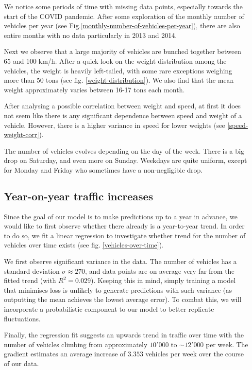 \documentclass[10pt,conference,compsocconf]{IEEEtran}
\begin{document}
We notice some periods of time with missing data points, especially towards the start of the COVID pandemic. After some exploration of the monthly number of vehicles per year (see Fig.\ref{monthly-number-of-vehicles-per-year}), there are also entire months with no data particularly in 2013 and 2014. 

Next we observe that a large majority of vehicles are bunched together between 65 and 100 km/h. After a quick look on the weight distribution among the vehicles, the weight is heavily left-tailed, with some rare exceptions weighing more than 50 tons (see fig. \ref{weight-distribution}). We also find that the mean weight approximately varies between 16-17 tons each month. 

After analysing a possible correlation between weight and speed, at first it does not seem like there is any significant dependence between speed and weight of a vehicle. However, there is a higher variance in speed for lower weights (see \ref{speed-weight-corr}).

The number of vehicles evolves depending on the day of the week. There is a big drop on Saturday, and even more on Sunday. Weekdays are quite uniform, except for Monday and Friday who sometimes have a non-negligible drop.

\subsection{Year-on-year traffic increases}

Since the goal of our model is to make predictions up to a year in advance, we would like to first observe whether there already is a year-to-year trend. In order to do so, we fit a linear regression to investigate whether trend for the number of vehicles over time exists (see fig. \ref{vehicles-over-time}). 

We first observe significant variance in the data. The number of vehicles has a standard deviation $\sigma \approx 270$, and data points are on average very far from the fitted trend (with $R^2 = 0.029$). Keeping this in mind, simply training a model that minimises loss is unlikely to generate predictions with such variance (as outputting the mean achieves the lowest average error). To combat this, we will incorporate a probabilistic component to our model to better replicate fluctuations. 

Finally, the regression fit suggests an upwards trend in traffic over time with the number of vehicles climbing from approximately $10'000$ to $\sim 12'000$ per week. The gradient estimates an average increase of $3.353$ vehicles per week over the course of our data. 
\end{document}
